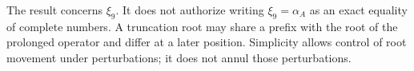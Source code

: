 The result concerns \(\xi_9\). It does not authorize writing
\(\xi_9=\alpha_A\) as an exact equality of complete numbers.
A truncation root may share a prefix with the root of the
prolonged operator and differ at a later position. Simplicity
allows control of root movement under perturbations; it does not
annul those perturbations.


